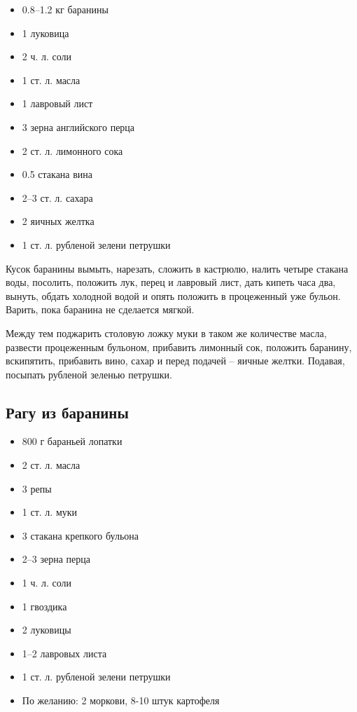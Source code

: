 \begin{itemize}
	\item 0.8–1.2 кг баранины
    \item 1 луковица
    \item 2 ч. л. соли 
    \item 1 ст. л. масла
    \item 1 лавровый лист
    \item 3 зерна английского перца
    \item 2 ст. л. лимонного сока
    \item 0.5 стакана вина
    \item 2–3 ст. л. сахара
    \item 2 яичных желтка
    \item 1 ст. л. рубленой зелени петрушки
\end{itemize}

Кусок баранины вымыть, нарезать, сложить в кастрюлю, налить четыре стакана воды, посолить, положить лук, перец и лавровый лист, дать кипеть часа два, вынуть, обдать холодной водой и опять положить в процеженный уже бульон. Варить, пока баранина не сделается мягкой.

Между тем поджарить столовую ложку муки в таком же количестве масла, развести процеженным бульоном, прибавить лимонный сок, положить баранину, вскипятить, прибавить вино, сахар и перед подачей – яичные желтки. Подавая, посыпать рубленой зеленью петрушки.

\subsection{Рагу из баранины}

\begin{itemize}
	\item 800 г бараньей лопатки
    \item 2 ст. л. масла
    \item 3 репы
    \item 1 ст. л. муки
    \item 3 стакана крепкого бульона
    \item 2–3 зерна перца 
    \item 1 ч. л. соли
    \item 1 гвоздика 
    \item 2 луковицы
    \item 1–2 лавровых листа
    \item 1 ст. л. рубленой зелени петрушки
    \item По желанию: 2 моркови, 8-10 штук картофеля
\end{itemize}

